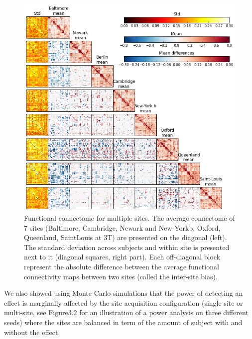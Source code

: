 \documentclass[authoryear]{elsarticle}
\begin{document}
\begin{figure}[H]
\begin{center}
\includegraphics[width=\linewidth]{../figures/connectome_multisite.png}
\end{center}
\caption[Connectome variability across sites]{
Functional connectome for multiple sites. The average connectome of 7 sites (Baltimore, Cambridge, Newark and New-Yorkb, Oxford, Queenland, SaintLouis at 3T) are presented on the diagonal (left). The standard deviation across subjects and within site is presented next to it (diagonal squares, right part). Each off-diagonal block represent the absolute difference between the average functional connectivity maps between two sites (called the inter-site bias).
}
\label{fig_DMN_variability}
\end{figure}


We also showed using Monte-Carlo simulations that the power of detecting an effect is marginally affected by the site acquisition configuration (single site or multi-site, see Figure3.2 for an illustration of a power analysis on three different seeds) where the sites are balanced in term of the amount of subject with and without the effect. 
\end{document}
